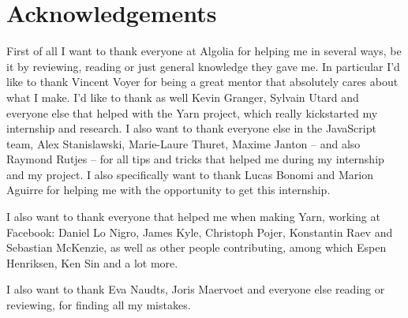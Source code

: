 
\chapter{Acknowledgements}%
\label{chp:acknowledgements}

First of all I want to thank everyone at Algolia for helping me in several ways, be it by reviewing, reading or just general knowledge they gave me. In particular I'd like to thank Vincent Voyer for being a great mentor that absolutely cares about what I make. I'd like to thank as well Kevin Granger, Sylvain Utard and everyone else that helped with the Yarn project, which really kickstarted my internship and research. I also want to thank everyone else in the JavaScript team, Alex Stanislawski, Marie-Laure Thuret, Maxime Janton -- and also Raymond Rutjes -- for all tips and tricks that helped me during my internship and my project. I also specifically want to thank Lucas Bonomi and Marion Aguirre for helping me with the opportunity to get this internship.

I also want to thank everyone that helped me when making Yarn, working at Facebook: Daniel Lo Nigro, James Kyle, Christoph Pojer, Konstantin Raev and Sebastian McKenzie, as well as other people contributing, among which Espen Henriksen, Ken Sin and a lot more.

I also want to thank Eva Naudts, Joris Maervoet and everyone else reading or reviewing, for finding all my mistakes.
